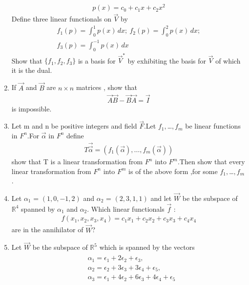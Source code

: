 \begin{enumerate}[label=\thesubsection.\arabic*.,ref=\thesubsection.\theenumi]
\begin{align}
    p(x) = c_0 + c_1x + c_2x^2 \nonumber
\end{align}
Define three linear functionals on $\vec{V}$ by
\begin{align}
    f_1(p) = \int_{0}^{1} p(x) \, dx; \: f_2(p) = \int_{0}^{2} p(x) \, dx; \nonumber \\
    f_3(p) = \int_{0}^{-1} p(x) \, dx \nonumber
\end{align}
Show that $\{f_1, f_2,f_3\}$ is a basis for $\vec{V}^*$ by exhibiting the basis for $\vec{V}$ of which it is the dual. 
%
\\
\solution

\item If $\vec{A}$ and $\vec{B}$ are $n\times n$ matrices , show that
\begin{align}
 \vec{A}\vec{B}-\vec{B}\vec{A} = \vec{I}\label{eq:solutions/3/5/5/3}  
\end{align}
is impossible.
%
\\
\solution

\item Let m and n be positive integers and field $\vec{F}$.Let $f_1,$\dots$,f_m$ be linear functions in $F^n$.For $\vec{\alpha}$ in $F^n$ define
\begin{align}
    T\vec{\vec{\alpha}}=(f_1(\vec{\alpha}),\dots,f_m(\vec{\alpha})) \label{eq:solutions/3/5/6/eq:main}
\end{align}
show that T is a linear transformation from $F^n$ into $F^m$.Then show that every linear transformation from $F^n$ into $F^m$ is of the above form ,for some $f_1,$\dots$,f_m$.
%
\\
\solution

\item Let $\alpha_1$ = $(1, 0,-1, 2)$ and $\alpha_2$ = $(2,3, 1,1)$ and let $\vec{W}$ be the subspace of $\mathbb{R}^4$ spanned by $\alpha_1$ and $\alpha_2$. Which linear functionals $\vec{f}$ :
\begin{align}
f(x_1,x_2,x_3,x_4) = c_1x_1 + c_2x_2 + c_3x_3 + c_4x_4 \label{eq:solutions/3/5/7/3} 
\end{align}
are in the annihilator of $\vec{W}$?
%
\\
\solution

\item Let $\vec{W}$ be the subspace of $\mathbb{R}^5$ which is spanned by the vectors  
   \begin{multline}
    \begin{aligned}
    &\alpha_1=\epsilon_1+2\epsilon_2+\epsilon_3,\\ &\alpha_2=\epsilon_2+3\epsilon_3+3\epsilon_4+\epsilon_5,\\&\alpha_3=\epsilon_1+4\epsilon_2+6\epsilon_3+4\epsilon_4+\epsilon_5

\end{aligned}
\end{multline}
\end{enumerate}
